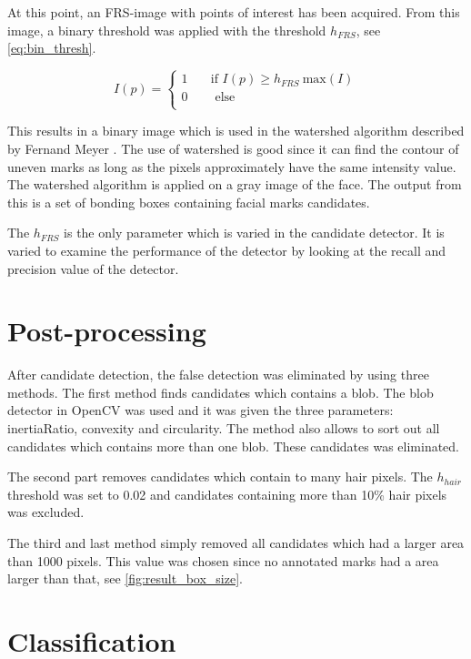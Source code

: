 At this point, an FRS-image with points of interest has been acquired. From this image, a binary threshold was applied with the threshold $h_{FRS}$, see \cref{eq:bin_thresh}.

\begin{equation} \label{eq:bin_thresh}
I(p) = 
\begin{cases}
1    & \quad \text{if } I(p) \geq h_{FRS} \: \text{max}(I) \\
0		& \quad  \text{ else}\\
\end{cases}
\end{equation}

This results in a binary image which is used in the watershed algorithm described by Fernand Meyer \cite{watershed}. The use of watershed is good since it can find the contour of uneven marks as long as the pixels approximately have the same intensity value. The watershed algorithm is applied on a gray image of the face. The output from this is a set of bonding boxes containing facial marks candidates.

The $h_{FRS}$ is the only parameter which is varied in the candidate detector. It is varied to examine the performance of the detector by looking at the recall and precision value of the detector. 

\section{Post-processing}

After candidate detection, the false detection was eliminated by using three methods. The first method finds candidates which contains a blob. The blob detector in OpenCV was used and it was given the three parameters: inertiaRatio, convexity and circularity. The method also allows to sort out all candidates which contains more than one blob. These candidates was eliminated.


The second part removes candidates which contain to many hair pixels. The $h_{hair}$ threshold was set to 0.02 and candidates containing more than 10\% hair pixels was excluded. 

The third and last method simply removed all candidates which had a larger area than 1000 pixels. This value was chosen since no annotated marks had a area larger than that, see \cref{fig:result_box_size}. 

\section{Classification}


